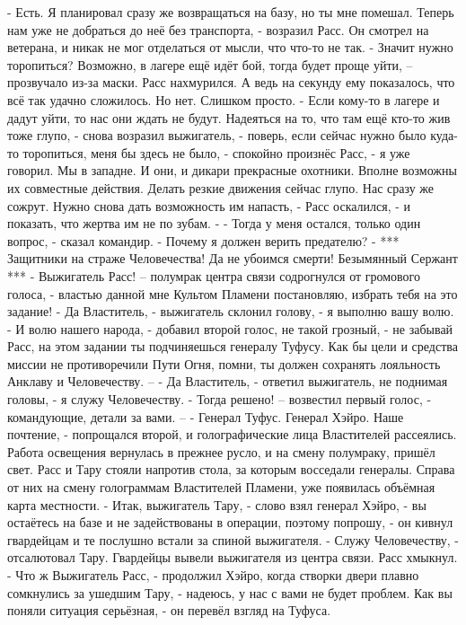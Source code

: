\documentclass[a4paper, 12pt]{report}
\begin{document}
- Есть. Я планировал сразу же возвращаться на базу, но ты мне помешал. Теперь нам уже не добраться до неё без транспорта, - возразил Расс. Он смотрел на ветерана, и никак не мог отделаться от мысли, что что-то не так.
- Значит нужно торопиться? Возможно, в лагере ещё идёт бой, тогда будет проще уйти, – прозвучало из-за маски. Расс нахмурился. А ведь на секунду ему показалось, что всё так удачно сложилось. Но нет. Слишком просто.
- Если кому-то в лагере и дадут уйти, то нас они ждать не будут. Надеяться на то, что там ещё кто-то жив тоже глупо, - снова возразил выжигатель, - поверь, если сейчас нужно было куда-то торопиться, меня бы здесь не было, - спокойно произнёс Расс, - я уже говорил. Мы в западне. И они, и дикари прекрасные охотники. Вполне возможны их совместные действия. Делать резкие движения сейчас глупо. Нас сразу же сожрут. Нужно снова дать возможность им напасть, - Расс оскалился, - и показать, что жертва им не по зубам. -  
- Тогда у меня остался, только один вопрос, - сказал командир. 
- Почему я должен верить предателю? - 
***
Защитники на страже Человечества! Да не убоимся смерти!
Безымянный Сержант
***
- Выжигатель Расс! – полумрак центра связи содрогнулся от громового голоса, - властью данной мне Культом Пламени постановляю, избрать тебя на это задание!
- Да Властитель, - выжигатель склонил голову, - я выполню вашу волю.
- И волю нашего народа, - добавил второй голос, не такой грозный, - не забывай Расс, на этом задании ты подчиняешься генералу Туфусу. Как бы цели и средства миссии не противоречили Пути Огня, помни, ты должен сохранять лояльность Анклаву и Человечеству. –
- Да Властитель, - ответил выжигатель, не поднимая головы, - я служу Человечеству.
- Тогда решено! – возвестил первый голос, - командующие, детали за вами. –
- Генерал Туфус. Генерал Хэйро. Наше почтение, - попрощался второй, и голографические лица Властителей рассеялись. Работа освещения вернулась в прежнее русло, и на смену полумраку, пришёл свет. Расс и Тару стояли напротив стола, за которым восседали генералы. Справа от них на смену голограммам Властителей Пламени, уже появилась объёмная карта местности.
- Итак, выжигатель Тару, - слово взял генерал Хэйро, - вы остаётесь на базе и не задействованы в операции, поэтому попрошу, - он кивнул гвардейцам и те послушно встали за спиной выжигателя.
- Служу Человечеству, - отсалютовал Тару. Гвардейцы вывели выжигателя из центра связи. Расс хмыкнул.
- Что ж Выжигатель Расс, - продолжил Хэйро, когда створки двери плавно сомкнулись за ушедшим Тару, - надеюсь, у нас с вами не будет проблем. Как вы поняли ситуация серьёзная, - он перевёл взгляд на Туфуса.
\end{document}
